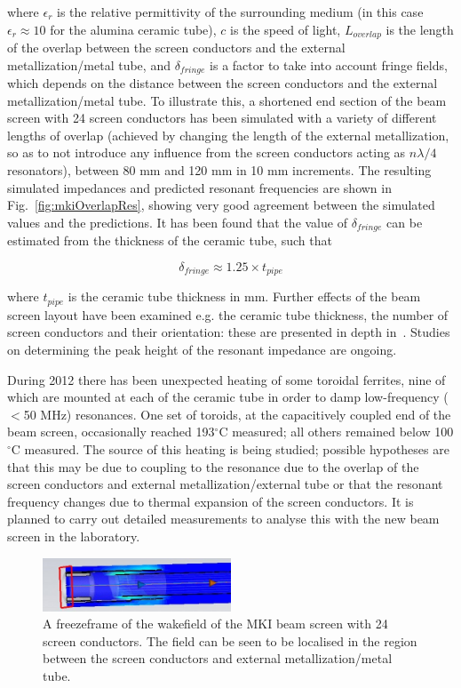 \documentclass{JAC2003}
\begin{document}
where $\epsilon_{r}$ is the relative permittivity of the surrounding medium (in this case $\epsilon_{r} \approx 10$ for the alumina ceramic tube), $c$ is the speed of light, $L_{overlap}$ is the length of the overlap between the screen conductors and the external metallization/metal tube, and $\delta_{fringe}$ is a factor to take into account fringe fields, which depends on the distance between the screen conductors and the external metallization/metal tube. To illustrate this, a shortened end section of the beam screen with 24 screen conductors has been simulated with a variety of different lengths of overlap (achieved by changing the length of the external metallization, so as to not introduce any influence from the screen conductors acting as $n \lambda /4$ resonators), between 80 mm and 120 mm in 10 mm increments. The resulting simulated impedances and predicted resonant frequencies are shown in Fig.~\ref{fig:mkiOverlapRes}, showing very good agreement between the simulated values and the predictions. It has been found that the value of $\delta_{fringe}$ can be estimated from the thickness of the ceramic tube, such that

\begin{equation}
\delta_{fringe} \approx 1.25 \times t_{pipe}
\end{equation}

where $t_{pipe}$ is the ceramic tube thickness in mm. Further effects of the beam screen layout have been examined e.g. the ceramic tube thickness, the number of screen conductors and their orientation: these are presented in depth in~\cite{DayThesis}. Studies on determining the peak height of the resonant impedance are ongoing. 

During 2012 there has been unexpected heating of some toroidal ferrites, nine of which are mounted at each of the ceramic tube in order to damp low-frequency ($<$50 MHz) resonances. One set of toroids, at the capacitively coupled end of the beam screen, occasionally reached 193$^{\circ}$C measured; all others remained below 100$^{\circ}$C measured. The source of this heating is being studied; possible hypotheses are that this may be due to coupling to the resonance due to the overlap of the screen conductors and external metallization/external tube or that the resonant frequency changes due to thermal expansion of the screen conductors. It is planned to carry out detailed measurements to analyse this with the new beam screen in the laboratory.

\begin{figure}
\includegraphics[width=0.5\textwidth]{resField.jpeg}
\caption{A freezeframe of the wakefield of the MKI beam screen with 24 screen conductors. The field can be seen to be localised in the region between the screen conductors and external metallization/metal tube.}
\label{fig:mkiResFieldPat}
\end{figure}
\end{document}
